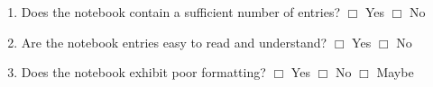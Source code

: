 \documentclass[letterpaper, 10pt]{article} %
\begin{document}
{\begin{enumerate}
\begin{itemize}
\item Observations about the assigned research papers

\item Comments about the reading assignments

\item Notes from the classroom discussions

\item Reports on meetings with professors

\item Description of techniques 

\item Technical diagrams

\item Equations and/or other mathematical notation

\item Statement of hypothesis or research question(s)

\item Lists of important papers

\item Other types of deliverables

\end{itemize} \vspace*{-.05in}

\item Does the notebook contain a sufficient number of
  entries? \hspace*{.05in} $\Box$ Yes \hspace*{.05in} $\Box$ No

\item Are the notebook entries easy to read and
  understand? \hspace*{.05in} $\Box$ Yes \hspace*{.05in} $\Box$ No

\item Does the notebook exhibit poor formatting? \hspace*{.05in}
  $\Box$ Yes \hspace*{.05in} $\Box$ No \hspace*{.05in} $\Box$ Maybe

\end{enumerate}

}
\end{document}
